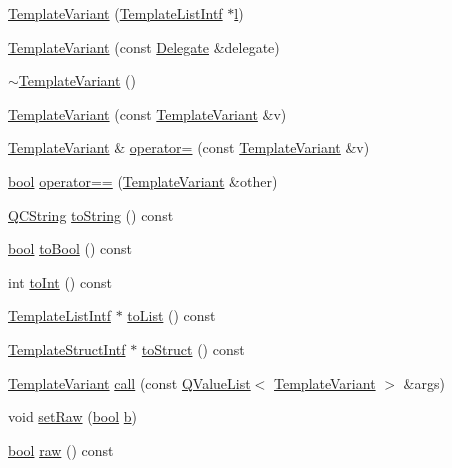\begin{DoxyCompactItemize}
\item 
\hyperlink{class_template_variant_a4e55aab3ce72fb006fa4e36b16bec0b6}{Template\+Variant} (\hyperlink{class_template_list_intf}{Template\+List\+Intf} $\ast$\hyperlink{060__command__switch_8tcl_aff56f84b49947b84b2a304f51cf8e678}{l})
\item 
\hyperlink{class_template_variant_a38cceb9da15e4edeb649545edbb647cc}{Template\+Variant} (const \hyperlink{class_template_variant_1_1_delegate}{Delegate} \&delegate)
\item 
\hyperlink{class_template_variant_a8fa8f46048c3cde3c719932060101a0a}{$\sim$\+Template\+Variant} ()
\item 
\hyperlink{class_template_variant_ad9594af6ca3e9f1f2688ac4f03fe106c}{Template\+Variant} (const \hyperlink{class_template_variant}{Template\+Variant} \&v)
\item 
\hyperlink{class_template_variant}{Template\+Variant} \& \hyperlink{class_template_variant_a113fe73f8110597f42969c431385aa19}{operator=} (const \hyperlink{class_template_variant}{Template\+Variant} \&v)
\item 
\hyperlink{qglobal_8h_a1062901a7428fdd9c7f180f5e01ea056}{bool} \hyperlink{class_template_variant_a8bb71720af66556958d79aa6c64f559b}{operator==} (\hyperlink{class_template_variant}{Template\+Variant} \&other)
\item 
\hyperlink{class_q_c_string}{Q\+C\+String} \hyperlink{class_template_variant_a33468148fdf1ef36de68de186de7feb0}{to\+String} () const 
\item 
\hyperlink{qglobal_8h_a1062901a7428fdd9c7f180f5e01ea056}{bool} \hyperlink{class_template_variant_a6b6357ec45060e81b2bf4c89e57bc829}{to\+Bool} () const 
\item 
int \hyperlink{class_template_variant_a80848a37b7e3af3a8f98e4766d5ae588}{to\+Int} () const 
\item 
\hyperlink{class_template_list_intf}{Template\+List\+Intf} $\ast$ \hyperlink{class_template_variant_a861eeeb205056c09900594212f3fa18d}{to\+List} () const 
\item 
\hyperlink{class_template_struct_intf}{Template\+Struct\+Intf} $\ast$ \hyperlink{class_template_variant_abe7a7435852a58e5b11657e9f7fccd59}{to\+Struct} () const 
\item 
\hyperlink{class_template_variant}{Template\+Variant} \hyperlink{class_template_variant_aa36e21ae53656963fd75b799e4fd0808}{call} (const \hyperlink{class_q_value_list}{Q\+Value\+List}$<$ \hyperlink{class_template_variant}{Template\+Variant} $>$ \&args)
\item 
void \hyperlink{class_template_variant_a3ca5dec8397f15321f13085ee5fefcc1}{set\+Raw} (\hyperlink{qglobal_8h_a1062901a7428fdd9c7f180f5e01ea056}{bool} \hyperlink{060__command__switch_8tcl_a68bdb74c144118d936931c46f75d4b3e}{b})
\item 
\hyperlink{qglobal_8h_a1062901a7428fdd9c7f180f5e01ea056}{bool} \hyperlink{class_template_variant_aff07dc3f78f5862853eaebe1eed9689d}{raw} () const 
\end{DoxyCompactItemize}


